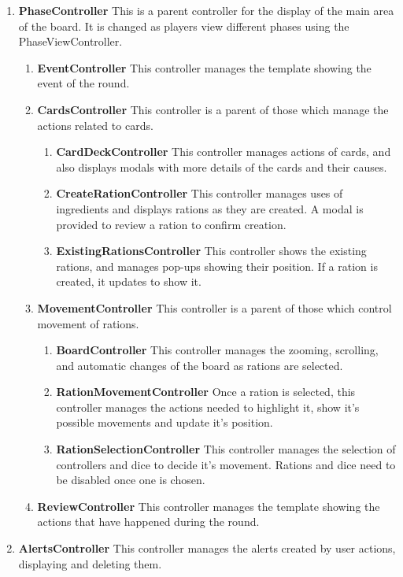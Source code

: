 \begin{enumerate}
	\item \textbf{PhaseController}
This is a parent controller for the display of the main area of the board. It is changed as players view different phases using the PhaseViewController.
	\begin{enumerate}
		\item \textbf{EventController} This controller manages the template showing the event of the round.
		\item \textbf{CardsController} This controller is a parent of those which manage the actions related to cards.
		\begin{enumerate}
			\item \textbf{CardDeckController} This controller manages actions of cards, and also displays modals with more details of the cards and their causes.
			\item \textbf{CreateRationController} This controller manages uses of ingredients and displays rations as they are created. A modal is provided to review a ration to confirm creation.
			\item \textbf{ExistingRationsController} This controller shows the existing rations, and manages pop-ups showing their position. If a ration is created, it updates to show it.
		\end{enumerate}
		\item \textbf{MovementController} This controller is a parent of those which control movement of rations.
		\begin{enumerate}
			\item \textbf{BoardController} This controller manages the zooming, scrolling, and automatic changes of the board as rations are selected.
			\item \textbf{RationMovementController} Once a ration is selected, this controller manages the actions needed to highlight it, show it's possible movements and update it's position.
			\item \textbf{RationSelectionController} This controller manages the selection of controllers and dice to decide it's movement. Rations and dice need to be disabled once one is chosen.
		\end{enumerate}
		\item \textbf{ReviewController} This controller manages the template showing the actions that have happened during the round.
	\end{enumerate}
	\item \textbf{AlertsController} This controller manages the alerts created by user actions, displaying and deleting them.
\end{enumerate}

